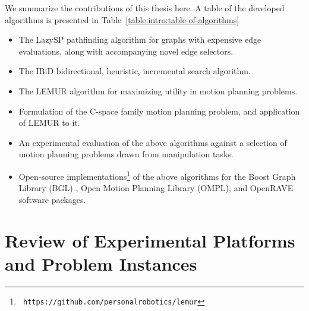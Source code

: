 We summarize the contributions of this thesis here.
A table of the developed algorithms is presented in
Table~\ref{table:intro:table-of-algorithms}

\begin{itemize}
\item The LazySP pathfinding algorithm for graphs with expensive
   edge evaluations,
   along with accompanying novel edge selectors.
\item The IBiD bidirectional, heuristic, incremental search algorithm.
\item The LEMUR algorithm for maximizing utility
   in motion planning problems.
\item Formulation of the C-space family motion planning problem,
   and application of LEMUR to it.
\item An experimental evaluation of the above algorithms against a
   selection of motion planning problems drawn from manipulation tasks.
\item Open-source implementations\footnote[][1cm]{\texttt{%
   https://github.com/personalrobotics/lemur}%
   }
   of the above algorithms for the
   Boost Graph Library (BGL) \citep{siek2001boostgraph},
   Open Motion Planning Library (OMPL), \citep{sucan2012ompl}
   and OpenRAVE \citep{diankov2010openrave} software packages.
\end{itemize}



\section{Review of Experimental Platforms and Problem Instances}

